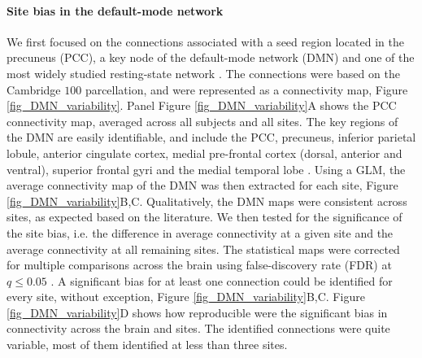 \documentclass[authoryear]{elsarticle}
\begin{document}
\paragraph{Site bias in the default-mode network} We first focused on the connections associated with a seed region located in the precuneus (PCC), a key node of the default-mode network (DMN) and one of the most widely studied resting-state network \citep{Greicius2004}. The connections were based on the Cambridge $100$ parcellation, and were represented as a connectivity map, Figure \ref{fig_DMN_variability}. Panel Figure \ref{fig_DMN_variability}A shows the PCC connectivity map, averaged across all subjects and all sites. The key regions of the DMN are easily identifiable, and include the PCC, precuneus, inferior parietal lobule, anterior cingulate cortex, medial pre-frontal cortex (dorsal, anterior and ventral), superior frontal gyri and the medial temporal lobe \citep{Damoiseaux2006,Dansereau2014,Yan2013a}. Using a GLM, the average connectivity map of the DMN was then extracted for each site, Figure \ref{fig_DMN_variability}B,C. Qualitatively, the DMN maps were consistent across sites, as expected based on the literature. We then tested for the significance of the site bias, i.e. the difference in average connectivity at a given site and the average connectivity at all remaining sites. The statistical maps were corrected for multiple comparisons across the brain using false-discovery rate (FDR) at $q\leq 0.05$ \citep{Benjamini1995}. A significant bias for at least one connection could be identified for every site, without exception, Figure \ref{fig_DMN_variability}B,C. Figure \ref{fig_DMN_variability}D shows how reproducible were the significant bias in connectivity across the brain and sites. The identified connections were quite variable, most of them identified at less than three sites.
\end{document}
